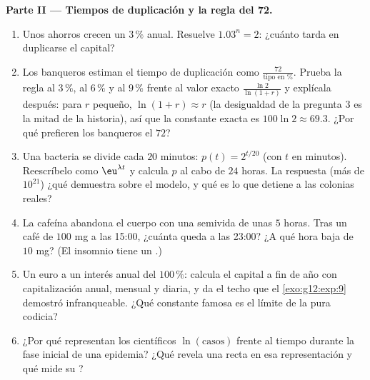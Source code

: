 \begin{problem}
\medskip
\noindent\textbf{Parte II --- Tiempos de duplicación y la regla del
72.}
\begin{enumerate}[resume]
  \item Unos ahorros crecen un $3\,\%$ anual. Resuelve $1.03^n = 2$:
        ¿cuánto tarda en duplicarse el capital?
  \item Los banqueros estiman el tiempo de duplicación como
        $\frac{72}{\text{tipo en }\%}$. Prueba la regla al $3\,\%$, al
        $6\,\%$ y al $9\,\%$ frente al valor exacto
        $\frac{\ln 2}{\ln(1 + r)}$ y explícala después: para $r$ pequeño,
        $\ln(1 + r) \approx r$ (la desigualdad de la pregunta 3 es la mitad
        de la historia), así que la constante exacta es
        $100 \ln 2 \approx 69.3$. ¿Por qué prefieren los banqueros el
        $72$?
  \item Una bacteria se divide cada $20$ minutos: $p(t) = 2^{t/20}$ (con
        $t$ en minutos). Reescríbelo como $\eu^{\lambda t}$ y calcula $p$
        al cabo de $24$ horas. La respuesta (más de $10^{21}$) ¿qué
        demuestra sobre el modelo, y qué es lo que detiene a las colonias
        reales?
  \item La cafeína abandona el cuerpo con una semivida de unas $5$ horas.
        Tras un café de $100$ mg a las 15:00, ¿cuánta queda a las 23:00? ¿A
        qué hora baja de $10$ mg? (El insomnio tiene un .)
  \item Un euro a un interés anual del $100\,\%$: calcula el capital a fin
        de año con capitalización anual, mensual y diaria, y da el techo
        que el \cref{exo:g12:exp:9} demostró infranqueable. ¿Qué constante
        famosa es el límite de la pura codicia?
  \item ¿Por qué representan los científicos $\ln(\text{casos})$ frente al
        tiempo durante la fase inicial de una epidemia? ¿Qué revela una
        recta en esa representación y qué mide su ?
\end{enumerate}


\end{problem}
